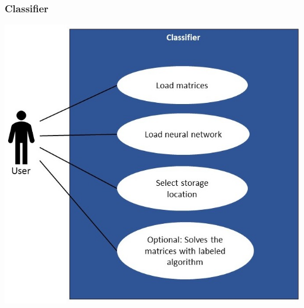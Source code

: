 \documentclass[parskip=full]{scrartcl}
\begin{document}
\subsubsection{Classifier}
\includegraphics[width=1\textwidth]{useCase_Classifier_scaled}

\clearpage
\end{document}
